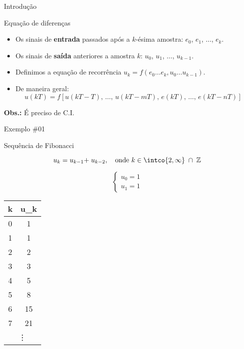 \begin{frame}{Introdução}
\begin{block}{Equação de diferenças}
\begin{itemize}
	\item Os sinais de \textbf{entrada} passados após a $ k $-ésima amostra:  $ e_0$, $e_1$, $\ldots $, $ e_{k} $.
	\item Os sinais de \textbf{saída} anteriores a amostra $ k $: $ u_0$, $u_1$, $\ldots $, $ u_{k-1} $.
	\item Definimos a equação de recorrência $ u_k =f\left(e_0\ldots e_k, u_0\ldots u_{k-1} \right) $.
	\item De maneira geral: $$ \boxed{u(kT)=f\left[u(kT-T)\text{, }\ldots\text{, } u(kT-mT)\text{, }e(kT)\text{, }\ldots\text{, }e(kT-nT) \right]} $$
\end{itemize}

\textbf{Obs.:} É preciso de C.I.
\end{block}
\end{frame}

\begin{frame}{Exemplo \#01}
\begin{block}{Sequência de Fibonacci}
	\begin{minipage}{0.45\linewidth}
		\centering
		\[ u_k=u_{k-1}\mathord{+}\;u_{k-2}, \quad \text{onde }k\in \intco{2,\infty}\;\cap\;\mathbb{Z} \]
		
		\[ \begin{cases}
		u_0=1\\
		u_1=1
		\end{cases} \]
	\end{minipage}
	\hfill
	\begin{minipage}{0.45\linewidth}
		\centering
		\begin{longtable}{CC}
			\toprule
			k & u_k\\ & 1\\
			1 & 1\\
			2 & 2\\
			3 & 3\\
			4 & 5\\
			5 & 8\\
			6 & 15\\
			7 & 21\\
			 \\
			\bottomrule
		\end{longtable}
	\end{minipage}
\end{block}
\end{frame}

